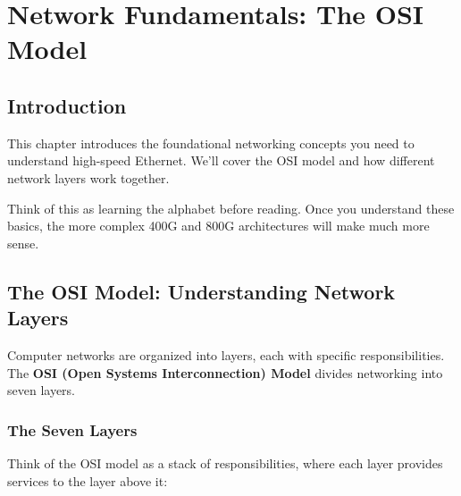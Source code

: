 \documentclass[openany]{tufte-book}
\title{\proptitle}
\author{}
\date{}
\begin{document}
\maketitle
\tableofcontents


\chapter{Network Fundamentals: The OSI Model}

\section{Introduction}

This chapter introduces the foundational networking concepts you need to understand high-speed Ethernet. We'll cover the OSI model and how different network layers work together.

Think of this as learning the alphabet before reading. Once you understand these basics, the more complex 400G and 800G architectures will make much more sense.

\section{The OSI Model: Understanding Network Layers}

Computer networks are organized into layers, each with specific responsibilities. The \textbf{OSI (Open Systems Interconnection) Model} divides networking into seven layers.

\subsection{The Seven Layers}

Think of the OSI model as a stack of responsibilities, where each layer provides services to the layer above it:
\end{document}
